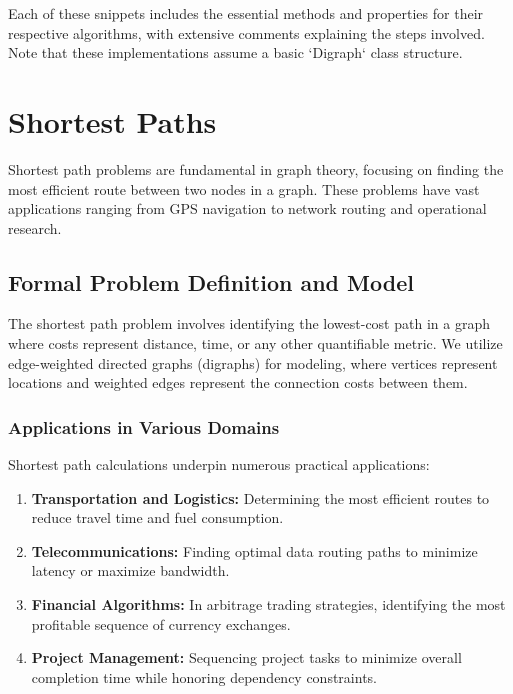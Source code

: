 \documentclass{article}
\begin{document}
Each of these snippets includes the essential methods and properties for their respective algorithms, with extensive comments explaining the steps involved. Note that these implementations assume a basic `Digraph` class structure.

\section{Shortest Paths}

Shortest path problems are fundamental in graph theory, focusing on finding the most efficient route between two nodes in a graph. These problems have vast applications ranging from GPS navigation to network routing and operational research.

\subsection{Formal Problem Definition and Model}
The shortest path problem involves identifying the lowest-cost path in a graph where costs represent distance, time, or any other quantifiable metric. We utilize edge-weighted directed graphs (digraphs) for modeling, where vertices represent locations and weighted edges represent the connection costs between them.

\subsubsection{Applications in Various Domains}
Shortest path calculations underpin numerous practical applications:
\begin{enumerate}
    \item \textbf{Transportation and Logistics:} Determining the most efficient routes to reduce travel time and fuel consumption.
    \item \textbf{Telecommunications:} Finding optimal data routing paths to minimize latency or maximize bandwidth.
    \item \textbf{Financial Algorithms:} In arbitrage trading strategies, identifying the most profitable sequence of currency exchanges.
    \item \textbf{Project Management:} Sequencing project tasks to minimize overall completion time while honoring dependency constraints.
\end{enumerate}
\end{document}
